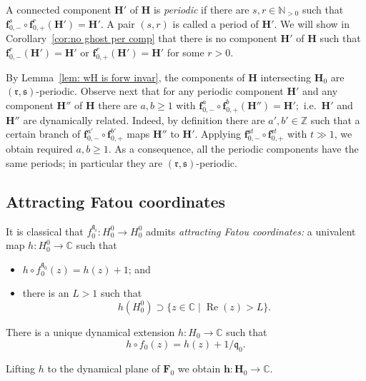\documentclass[]{amsart}
\renewcommand{\Re}{\operatorname {Re}}
\newcommand{\bF}{{\mathbf F}}
\newcommand{\bH}{{\mathbf H}}
\newcommand{\bbf}{{\mathbf f}}
\newcommand{\bbh}{{\mathbf h}}
\renewcommand{\qq}{\mathfrak{q}}
\newcommand{\rr}{\mathfrak{r}}
\renewcommand{\ss}{\mathfrak{s}}
\newcommand{\C}{\mathbb{C}}
\newcommand{\N}{\mathbb{N}}
\newcommand{\Z}{\mathbb{Z}}
\theoremstyle{remark}
\numberwithin{equation}{section}
\theoremstyle{definition}
\begin{document}
A connected component $\bH'$ of $\bH$ is \emph{periodic} if there are $s,r\in \N_{> 0}$ such that $\bbf_{0,-}^s\circ \bbf_{0,+}^r(\bH')=\bH'$. A pair $(s,r)$ is called a period of $\bH'$. We will show in Corollary~\ref{cor:no ghost per comp} that there is no component $\bH'$ of $\bH$ such that $\bbf^r_{0,-}(\bH') =\bH'$ or $\bbf^r_{0,+}(\bH') =\bH'$ for some $r>0$. 

 By Lemma~\ref{lem: wH is forw invar}, the components of $ \bH$ intersecting $\bH_0$ are $(\rr,\ss)$-periodic. Observe next that for any periodic component $\bH'$ and any component $\bH''$ of $\bH$ there are $a,b\ge 1$ with $\bbf_{0,-}^a\circ \bbf_{0,+}^b(\bH'')=\bH'$;~i.e.~$\bH'$ and $\bH''$ are dynamically related. Indeed, by definition there are $a',b'\in \Z$ such that a certain branch of $\bbf_{0,-}^{a'}\circ \bbf_{0,+}^{b'}$ maps $\bH''$  to $\bH'$. Applying $\bbf_{0,-}^{\ss t}\circ \bbf_{0,+}^{\rr t}$ with $t\gg 1$, we obtain required $a,b\ge 1$. As a consequence, all the periodic components have the same periods; in particular they are $(\rr,\ss)$-periodic. 
 


\subsection{Attracting Fatou coordinates}
\label{ss:AttrFatCoord}
 It is classical that $f_0^{\qq_i}\colon H_{0}^{0}\to H_{0}^{0}$ admits \emph{attracting Fatou coordinates:} a univalent map $h:  H_{0}^{0} \to \C$ such that
\begin{itemize}
\item $h\circ f^{\qq_0}_0(z)= h(z)+1$; and
\item there is an $L>1$  such that 
\begin{equation}
\label{eq:dfn:L} h(H_{0}^{0})\supset  \{z\in \C \mid \Re(z)> L\}.
\end{equation}
\end{itemize}

There is a unique dynamical extension $h\colon H_{0}\to \C$ such that
\begin{equation}
\label{eq:defn:h}h\circ f_0(z)= h(z)+1/\qq_0.
\end{equation}


Lifting $h$ to the dynamical plane of $\bF_{0}$ we obtain $\bbh\colon  \bH_{0}\to \C$.
\end{document}
